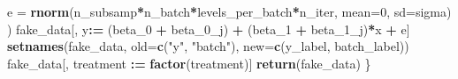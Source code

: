 \documentclass[]{book}
\newenvironment{Shaded}{\begin{snugshade}}{\end{snugshade}}
\newcommand{\DataTypeTok}[1]{\textcolor[rgb]{0.13,0.29,0.53}{#1}}
\newcommand{\DecValTok}[1]{\textcolor[rgb]{0.00,0.00,0.81}{#1}}
\newcommand{\ErrorTok}[1]{\textcolor[rgb]{0.64,0.00,0.00}{\textbf{#1}}}
\newcommand{\KeywordTok}[1]{\textcolor[rgb]{0.13,0.29,0.53}{\textbf{#1}}}
\newcommand{\NormalTok}[1]{#1}
\newcommand{\OperatorTok}[1]{\textcolor[rgb]{0.81,0.36,0.00}{\textbf{#1}}}
\newcommand{\StringTok}[1]{\textcolor[rgb]{0.31,0.60,0.02}{#1}}
\begin{document}
\begin{Shaded}
\begin{Highlighting}[]
    \DataTypeTok{e =} \KeywordTok{rnorm}\NormalTok{(n_subsamp}\OperatorTok{*}\NormalTok{n_batch}\OperatorTok{*}\NormalTok{levels_per_batch}\OperatorTok{*}\NormalTok{n_iter, }\DataTypeTok{mean=}\DecValTok{0}\NormalTok{, }\DataTypeTok{sd=}\NormalTok{sigma)}
\NormalTok{  )}
\NormalTok{  fake_data[, y}\OperatorTok{:}\ErrorTok{=}\StringTok{ }\NormalTok{(beta_}\DecValTok{0} \OperatorTok{+}\StringTok{ }\NormalTok{beta_}\DecValTok{0}\NormalTok{_j) }\OperatorTok{+}\StringTok{ }\NormalTok{(beta_}\DecValTok{1} \OperatorTok{+}\StringTok{ }\NormalTok{beta_}\DecValTok{1}\NormalTok{_j)}\OperatorTok{*}\NormalTok{x }\OperatorTok{+}\StringTok{ }\NormalTok{e]}
  \KeywordTok{setnames}\NormalTok{(fake_data, }\DataTypeTok{old=}\KeywordTok{c}\NormalTok{(}\StringTok{"y"}\NormalTok{, }\StringTok{"batch"}\NormalTok{), }\DataTypeTok{new=}\KeywordTok{c}\NormalTok{(y_label, batch_label))}
\NormalTok{  fake_data[, treatment }\OperatorTok{:}\ErrorTok{=}\StringTok{ }\KeywordTok{factor}\NormalTok{(treatment)]}
  \KeywordTok{return}\NormalTok{(fake_data)}
\NormalTok{\}}
\end{Highlighting}
\end{Shaded}
\end{document}
